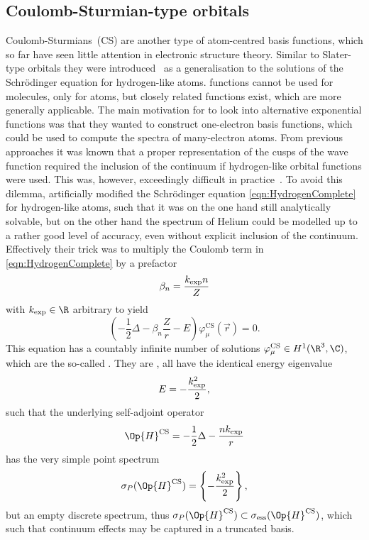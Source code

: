 \subsection{Coulomb-Sturmian-type orbitals}
\label{sec:BasisCS}
Coulomb-Sturmians~(CS) are another type of atom-centred basis functions,
which so far have seen little attention in electronic structure theory.
Similar to Slater-type orbitals
they were introduced~\cite{Shull1959}
as a generalisation to the solutions of the Schrödinger equation for hydrogen-like atoms.
\CS functions cannot be used for molecules, only for atoms,
but closely related functions exist,
which are more generally applicable.
The main motivation for \citet{Shull1959} to look into alternative
exponential functions was that they wanted to construct one-electron basis functions,
which could be used to compute the spectra of many-electron atoms.
From previous approaches it was known that a
proper representation of the cusps of the wave function
required the inclusion of the continuum
if hydrogen-like orbital functions were used.
This was, however, exceedingly difficult in practice~\cite{Avery2006}.
To avoid this dilemma, \citet{Shull1959} artificially modified
the Schrödinger equation \eqref{eqn:HydrogenComplete}
for hydrogen-like atoms,
such that it was on the one hand still analytically solvable,
but on the other hand the spectrum of Helium could be modelled
up to a rather good level of accuracy,
even without explicit inclusion of the continuum.
Effectively their trick was to multiply the Coulomb term
in \eqref{eqn:HydrogenComplete} by a prefactor
\begin{equation}
	\beta_n = \frac{k_\text{exp} n}{Z}
	\label{eqn:CSbeta}
\end{equation}
with $\kexp \in \R$ arbitrary to yield
\begin{equation}
	\left( - \frac12 \Delta - \beta_n \frac{Z}{r} - E \right) \varphi^\text{CS}_\mu(\vec{r}) = 0.
	\label{eqn:CS}
\end{equation}
This equation has a countably infinite number of solutions
$\varphi^\text{CS}_\mu \in H^1(\R^3, \C)$,
which are the so-called .
They are ,
\ie all have the identical energy eigenvalue
\begin{equation}
	E = -\frac{k_\text{exp}^2}{2},
	\label{eqn:CSenergy}
\end{equation}
such that the underlying self-adjoint operator
\[ \Op{H}^\text{CS} = - \frac12 \Delta - \frac{n\kexp}{r} \]
has the very simple point spectrum
\[ \sigma_P(\Op{H}^\text{CS}) = \left\{ -\frac{\kexp^2}{2} \right\}, \]
but an empty discrete spectrum,
thus $\sigma_P(\Op{H}^\text{CS}) \subset \sigma_\text{ess}(\Op{H}^\text{CS})$,
which such that continuum effects may be captured in a truncated basis.

